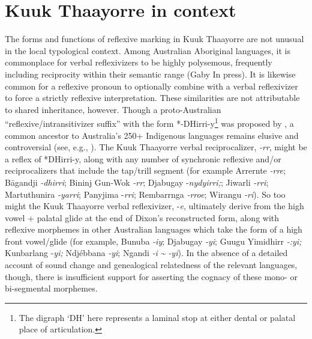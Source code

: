 \documentclass[output=paper]{langscibook}
\begin{document}
\section{Kuuk Thaayorre in context}
\label{sec:Gaby:6}
The forms and functions of reflexive marking in Kuuk Thaayorre are not unusual in the local typological context. Among Australian Aboriginal languages, it is commonplace for verbal reflexivizers to be highly polysemous, frequently including reciprocity within their semantic range (Gaby In press). It is likewise common for a reflexive pronoun to optionally combine with a verbal reflexivizer to force a strictly reflexive interpretation. These similarities are not attributable to shared inheritance, however. Though a proto-Australian “reflexive/intransitivizer suffix” with the form *-DHirri-y\footnote{The digraph ‘DH’ here represents a laminal stop at either dental or palatal place of articulation.} was proposed by \citet[447]{Dixon1980}, a common ancestor to Australia’s 250+ Indigenous languages remains elusive and controversial (see, e.g., \citealt{HarveyMailhammer2017}). The Kuuk Thaayorre verbal reciprocalizer, \textit{{}-rr}, might be a reflex of *DHirri-y, along with any number of synchronic reflexive and/or reciprocalizers that include the tap/trill segment (for example Arrernte \textit{{}-rre}; Bāgandji \textit{{}-dhirri}; Bininj Gun-Wok \textit{{}-rr}; Djabugay \nobreakdash-\textit{nydyirri;}; Jiwarli \textit{\nobreakdash-rri}; Martuthunira \textit{\nobreakdash-yarri}; Panyjima \nobreakdash-\textit{rri}; Rembarrnga \textit{\nobreakdash-rroe}; Wirangu \textit{\nobreakdash-ri}). So too might the Kuuk Thaayorre verbal reflexivizer, -\textit{e}, ultimately derive from the high vowel + palatal glide at the end of Dixon’s reconstructed form, along with reflexive morphemes in other Australian languages which take the form of a high front vowel/glide (for example, Bunuba \textit{\nobreakdash-iy}; Djabugay \textit{\nobreakdash-yi}; Guugu Yimidhirr \textit{-:yi;} Kunbarlang -\textit{yi;} Ndjébbana \textit{\nobreakdash-yi}; Ngandi \textit{\nobreakdash-i} \textit{{\textasciitilde} -yi}). In the absence of a detailed account of sound change and genealogical relatedness of the relevant languages, though, there is insufficient support for asserting the cognacy of these mono- or bi-segmental morphemes.  
\end{document}
